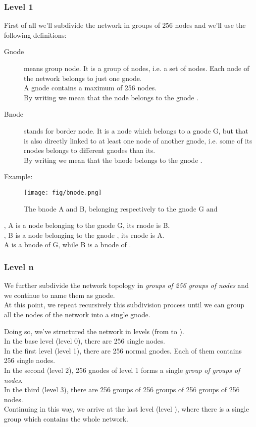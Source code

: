 \documentclass[a4paper]{article}
\begin{document}
\subsubsection{Level 1}
First of all we'll subdivide the network in groups of 256 nodes and we'll use
the following definitions:
\begin{description}
	\item[Gnode] means group node. It is a group of nodes, i.e. a set of
		nodes. Each node of the network belongs to just one gnode.\\
		A gnode contains a maximum of 256 nodes.\\
		By writing  we mean that the node  belongs to the
		gnode .
	\item[Bnode] stands for border node. It is a node which belongs to a
		gnode G, but that is also directly linked to at least one node
		of another gnode, i.e. some of its rnodes belongs to different
		gnodes than its.\\
		By writing  we mean that the bnode  belongs to the
		gnode .
\end{description}

Example:\\
\begin{figure}[h]
	\begin{center}
		\texttt{[image: fig/bnode.png]}
	\end{center}
	\caption{The bnode A and B, belonging respectively to the gnode G and
	}
\end{figure}
, A is a node belonging to the gnode G, its rnode is B.\\
, B is a node belonging to the gnode , its rnode is A.\\
A is a bnode of G, while B is a bnode of .

\subsubsection{Level n}
We further subdivide the network topology in \emph{groups of 256 groups of nodes}
and we continue to name them as gnode.\\
At this point, we repeat recursively this subdivision process until
we can group all the nodes of the network into a single gnode.

Doing so, we've structured the network in  levels (from  to ).\\
In the base level (level 0), there are 256 single nodes.\\
In the first level (level 1), there are 256 normal gnodes. Each of them
contains 256 single nodes.\\
In the second (level 2), 256 gnodes of level 1 forms a single \emph{group of
groups of nodes}.\\
In the third (level 3), there are 256 groups of 256 groups of 256 groups of
256 nodes.\\
Continuing in this way, we arrive at the last level (level ), where there
is a single group which contains the whole network.\\
\end{document}
